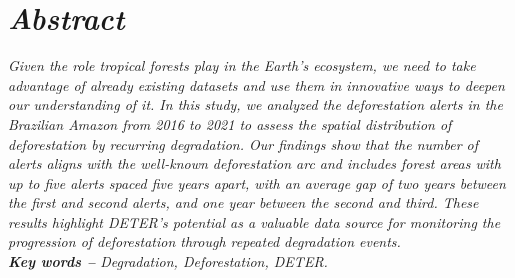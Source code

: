 \section*{\textit {Abstract}} %

\hspace{-1.5mm}\textit{ %
Given the role tropical forests play in the Earth’s ecosystem, we need to take advantage of already existing datasets and use them in innovative ways to deepen our understanding of it.
In this study, we analyzed the deforestation alerts in the Brazilian Amazon from 2016 to 2021 to assess the spatial distribution of deforestation by recurring degradation.
Our findings show that the number of alerts aligns with the well-known deforestation arc and includes forest areas with up to five alerts spaced five years apart, with an average gap of two years between the first and second alerts, and one year between the second and third.
These results highlight DETER's potential as a valuable data source for monitoring the progression of deforestation through repeated degradation events.
}
\\

\textit{\textbf{Key words --} %
Degradation, Deforestation, DETER. %
}

